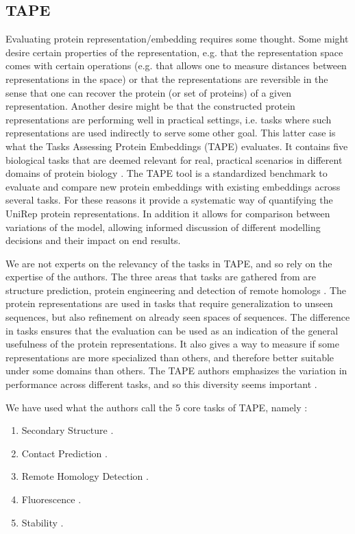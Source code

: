 \documentclass[a4paper,12pt]{article}
\begin{document}
\subsection{TAPE}
Evaluating protein representation/embedding requires some thought. Some might desire certain properties of the representation, e.g. that the representation space comes with certain operations (e.g. that allows one to measure distances between representations in the space) or that the representations are reversible in the sense that one can recover the protein (or set of proteins) of a given representation. Another desire might be that the constructed protein representations are performing well in practical settings, i.e. tasks where such representations are used indirectly to serve some other goal. This latter case is what the Tasks Assessing Protein Embeddings (TAPE) evaluates. It contains five biological tasks that are deemed relevant for real, practical scenarios in different domains of protein biology \cite{tape2019}. The TAPE tool is a standardized benchmark to evaluate and compare new protein embeddings with existing embeddings across several tasks. For these reasons it provide a systematic way of quantifying the UniRep protein representations. In addition it allows for comparison between variations of the model, allowing informed discussion of different modelling decisions and their impact on end results.

We are not experts on the relevancy of the tasks in TAPE, and so rely on the expertise of the authors. The three areas that tasks are gathered from are structure prediction, protein engineering and detection of remote homologs \cite{tape2019}. The protein representations are used in tasks that require generalization to unseen sequences, but also refinement on already seen spaces of sequences. The difference in tasks ensures that the evaluation can be used as an indication of the general usefulness of the protein representations. It also gives a way to measure if some representations are more specialized than others, and therefore better suitable under some domains than others. The TAPE authors emphasizes the variation in performance across different tasks, and so this diversity seems important \cite{tape2019}.

We have used what the authors call the 5 core tasks of TAPE, namely :
\begin{enumerate}
    \item Secondary Structure \cite{ pdb, casp, netsurfp}.
    \item Contact Prediction \cite{scop, proteinnet}.
    \item Remote Homology Detection \cite{scop}.
    \item Fluorescence \cite{sarkisyan2016}.
    \item Stability \cite{rocklin2017}.
\end{enumerate}
\end{document}
